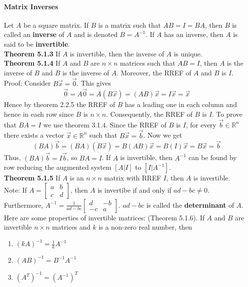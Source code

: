 \documentclass[10pt,letter]{article}
\begin{document}
\paragraph{Matrix Inverses} Let $A$ be a square matrix. If $B$ is a matrix such that $AB=I=BA$, then $B$ is called an \textbf{inverse} of $A$ and is denoted $B=A^{-1}$. If $A$ has an inverse, then $A$ is said to be \textbf{invertible}.\\ 
\textbf{Theorem 5.1.3} If $A$ is invertible, then the inverse of $A$ is unique. \\ 
\textbf{Theorem 5.1.4} If $A$ and $B$ are $n\times n$ matrices such that $AB=I$, then $A$ is the inverse of $B$ and $B$ is the inverse of $A$. Moreover, the RREF of $A$ and $B$ is $I$. \\ 
Proof: Consider $B\vec{x}=\vec{0}$. This gives $$\vec{0}=A\vec{0}=A(B\vec{x})=(AB)\vec{x}=I\vec{x}=\vec{x}$$ Hence by theorem 2.2.5 the RREF of $B$ has a leading one in each column and hence in each row since $B$ is $n\times n$. Consequently, the RREF of $B$ is $I$. To prove that $BA=I$ we use theorem 3.1.4. Since the RREF of $B$ is $I$, for every $\vec{b}\in\mathbb{R}^n$ there exists a vector $\vec{x}\in\mathbb{R}^n$ such that $B\vec{x}=\vec{b}$. Now we get $$(BA)\vec{b}=(BA)(B\vec{x})=B(AB)\vec{x}=B(I)\vec{x}=B\vec{x}=\vec{b}$$ Thus, $(BA)\vec{b}=I\vec{b}$, so $BA=I$. If $A$ is invertible, then $A^{-1}$ can be found by row reducing the augmented system $[A|I]$ to $[I|A^{-1}]$. \\ 
\textbf{Theorem 5.1.5} If $A$ is an $n\times n$ matrix with RREF $I$, then $A$ is invertible. \\ 
Note: If $A=\begin{bmatrix}a&b\\c&d\end{bmatrix}$, then $A$ is invertibe if and only if $ad-bc\neq 0$. Furthermore, $A^{-1}=\frac{1}{ad-bc}\begin{bmatrix}d&-b\\-c&a\end{bmatrix}$. $ad-bc$ is called the \textbf{determinant} of $A$. \\ 
Here are some properties of invertible matrices: (Theorem 5.1.6). If $A$ and $B$ are invertible $n\times n$ matrices and $k$ is a non-zero real number, then \begin{enumerate}
    \item $(kA)^{-1}=\frac{1}{k}A^{-1}$ 
    \item $(AB)^{-1}=B^{-1}A^{-1}$ 
    \item $(A^T)^{-1}=(A^{-1})^T$
\end{enumerate}
\end{document}
